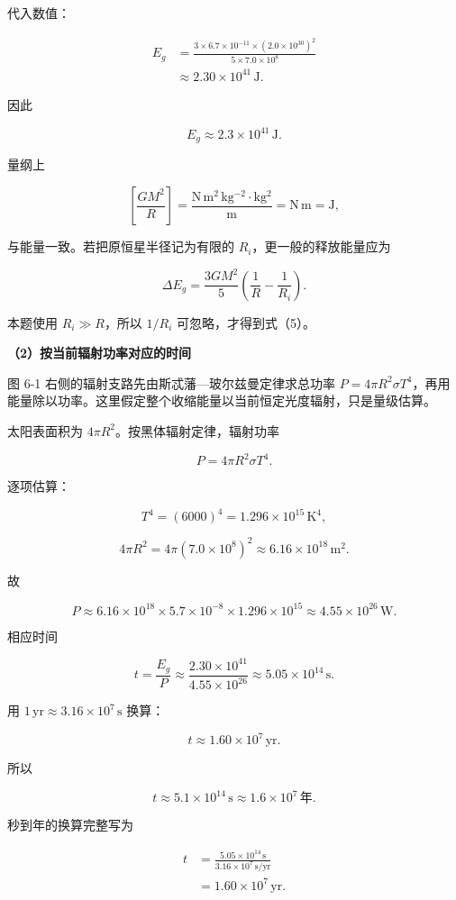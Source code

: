 \documentclass[12pt,a4paper,UTF8]{ctexart}
\begin{document}
代入数值：

\[\begin{aligned}
E_g
&=\frac{3\times6.7\times10^{-11}
\times(2.0\times10^{30})^2}
{5\times7.0\times10^8}\\
&\approx2.30\times10^{41}\,\mathrm J.
\end{aligned}\]

因此

\[\boxed{E_g\approx2.3\times10^{41}\,\mathrm J}. \tag{6}\]

量纲上

\[\left[\frac{GM^2}{R}\right]
=\frac{\mathrm{N\,m^2\,kg^{-2}}\cdot\mathrm{kg^2}}{\mathrm m}
=\mathrm{N\,m}=\mathrm J,\]

与能量一致。若把原恒星半径记为有限的 \(R_i\)，更一般的释放能量应为

\[\Delta E_g=\frac{3GM^2}{5}
\left(\frac1R-\frac1{R_i}\right).\]

本题使用 \(R_i\gg R\)，所以 \(1/R_i\) 可忽略，才得到式（5）。

\textbf{（2）按当前辐射功率对应的时间}

图 6-1 右侧的辐射支路先由斯忒藩---玻尔兹曼定律求总功率
\(P=4\pi R^2\sigma T^4\)，再用能量除以功率。这里假定整个收缩能量以当前恒定光度辐射，只是量级估算。

太阳表面积为 \(4\pi R^2\)。按黑体辐射定律，辐射功率

\[P=4\pi R^2\sigma T^4. \tag{7}\]

逐项估算：

\[T^4=(6000)^4=1.296\times10^{15}\,\mathrm K^4,\]

\[4\pi R^2=4\pi(7.0\times10^8)^2
\approx6.16\times10^{18}\,\mathrm{m^2}.\]

故

\[P\approx6.16\times10^{18}
\times5.7\times10^{-8}
\times1.296\times10^{15}
\approx4.55\times10^{26}\,\mathrm W. \tag{8}\]

相应时间

\[t=\frac{E_g}{P}
\approx\frac{2.30\times10^{41}}{4.55\times10^{26}}
\approx5.05\times10^{14}\,\mathrm s. \tag{9}\]

用 \(1\,\mathrm{yr}\approx3.16\times10^7\,\mathrm s\) 换算：

\[t\approx1.60\times10^7\,\mathrm{yr}. \tag{10}\]

所以

\[\boxed{t\approx5.1\times10^{14}\,\mathrm s
\approx1.6\times10^7\,\text{年}}.\]

秒到年的换算完整写为

\[\begin{aligned}
t
&=\frac{5.05\times10^{14}\,\mathrm s}
{3.16\times10^7\,\mathrm{s/yr}}\\
&=1.60\times10^7\,\mathrm{yr}.
\end{aligned}\]
\end{document}

